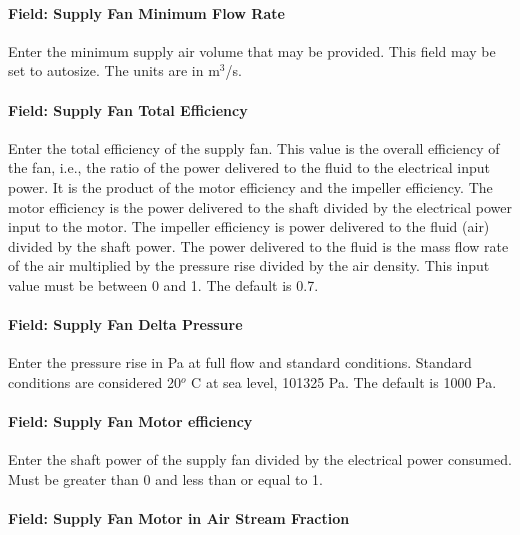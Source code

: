 \paragraph{Field: Supply Fan Minimum Flow Rate}\label{field-supply-fan-minimum-flow-rate}

Enter the minimum supply air volume that may be provided. This field may be set to autosize. The units are in m\(^{3}\)/s.

\paragraph{Field: Supply Fan Total Efficiency}\label{field-supply-fan-total-efficiency-8}

Enter the total efficiency of the supply fan. This value is the overall efficiency of the fan, i.e., the ratio of the power delivered to the fluid to the electrical input power. It is the product of the motor efficiency and the impeller efficiency. The motor efficiency is the power delivered to the shaft divided by the electrical power input to the motor. The impeller efficiency is power delivered to the fluid (air) divided by the shaft power. The power delivered to the fluid is the mass flow rate of the air multiplied by the pressure rise divided by the air density. This input value must be between 0 and 1. The default is 0.7.

\paragraph{Field: Supply Fan Delta Pressure}\label{field-supply-fan-delta-pressure-7}

Enter the pressure rise in Pa at full flow and standard conditions. Standard conditions are considered 20\(^{o}\) C at sea level, 101325 Pa. The default is 1000 Pa.

\paragraph{Field: Supply Fan Motor efficiency}\label{field-supply-fan-motor-efficiency-8}

Enter the shaft power of the supply fan divided by the electrical power consumed. Must be greater than 0 and less than or equal to 1.

\paragraph{Field: Supply Fan Motor in Air Stream Fraction}\label{field-supply-fan-motor-in-air-stream-fraction-4}


